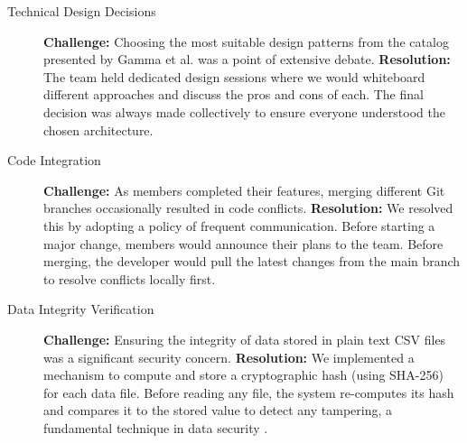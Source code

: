 \begin{description}
	\item[Technical Design Decisions]
	      \textbf{Challenge:} Choosing the most suitable design patterns from the catalog presented by Gamma et al. \cite{GoF1994} was a point of extensive debate.
	      \textbf{Resolution:} The team held dedicated design sessions where we would whiteboard different approaches and discuss the pros and cons of each. The final decision was always made collectively to ensure everyone understood the chosen architecture.

	\item[Code Integration]
	      \textbf{Challenge:} As members completed their features, merging different Git branches occasionally resulted in code conflicts.
	      \textbf{Resolution:} We resolved this by adopting a policy of frequent communication. Before starting a major change, members would announce their plans to the team. Before merging, the developer would pull the latest changes from the main branch to resolve conflicts locally first.

	\item[Data Integrity Verification]
	      \textbf{Challenge:} Ensuring the integrity of data stored in plain text CSV files was a significant security concern.
	      \textbf{Resolution:} We implemented a mechanism to compute and store a cryptographic hash (using SHA-256) for each data file. Before reading any file, the system re-computes its hash and compares it to the stored value to detect any tampering, a fundamental technique in data security \cite{Stallings2017}.
\end{description}
